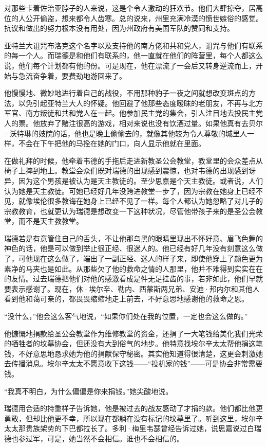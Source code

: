 \par 对那些卡着佐治亚脖子的人来说，这是个令人激动的狂欢节。他们大肆掠夺，居高位的人公开偷盗，想来都令人齿寒。总的说来，州里充满冷漠的愤世嫉俗的感觉。抗议和做出的努力根本没有用处，因为州政府有美国军队的赞同和支持。
\par 亚特兰大诅咒布洛克这个名字以及支持他的南方佬和共和党人，诅咒与他们有联系的每一个人。而瑞德是和他们有联系的，他一直就在他们的阵营里，每个人都这么说，他们每个计划都有他的份。可是现在，他在漂流了一会后又转身逆流而上，开始与急流奋争着，要费劲地游回来了。
\par 他慢慢地、微妙地进行着自己的战役，不用那种豹子一夜之间就想改变斑点的方法，以免引起亚特兰大人的怀疑。他回避了他那些态度暧昧的老朋友，不再与北方军官、南方叛徒和共和党人在一起。他参加民主党的集会，引人注目地去投民主党人的票。他放弃了赌注很高的游戏，相对来说也没有饮酒过量。如果他真有去贝尔·沃特琳的妓院的话，他也是晚上偷偷去的，就像其他较为令人尊敬的城里人一样，不会在下午把他的马拴在她的门口，向人显示他就在里面。
\par 在做礼拜的时候，他牵着韦德的手拖后走进新教圣公会教堂，教堂里的会众差点从椅子上摔到地上。教堂会众们既对瑞德的出现感到震惊，也对韦德的出现感到讶异，因为这个男孩是被认为是天主教徒的。至少思嘉是个天主教徒。或者说，人们认为她是天主教徒。可她已经好几年没跨进教堂一步了，因为宗教在她身上已经不见，就像埃伦很多教诲在她身上已经不见了一样。每个人都认为她忽略了对儿子的宗教教育，也就更认为瑞德是想改变一下这种状况，尽管他带孩子来的是圣公会教堂，而不是天主教教堂。
\par 瑞德若是有意管住自己的舌头，不让他那乌黑的眼睛里现出不怀好意、眉飞色舞的神色的话，他是可以做到举止很正经、很迷人的。他已经有好几年没有刻意这么做了，可他现在这么做了，端出了一副正经、迷人的样子来，即使他穿上了颜色更为素净的马夹也是如此。从那些欠了他的救命之情的人那里，他并不难得到实实在在的友情。过去瑞德把他们对他的感激看成是件无足挂齿的事，若非如此，他们早就要表示感谢了。现在，休·埃尔辛、勒内、西蒙斯两兄弟、安迪·邦内尔和其他人看到他和蔼可亲的，都畏畏缩缩地走上前去，不好意思地感谢他的救命之恩。
\par “没什么，”他会这么客气地说，“如果你们处在我的位置，一定也会这么做的。”
\par 他慷慨地捐款给圣公会教堂作为维修教堂的资金，还捐了一大笔钱给美化我们光荣的牺牲者的坟墓协会，但还没有大到俗气的地步。他特意找埃尔辛太太帮他捐这笔钱，不好意思地恳求她为他的捐献保守秘密。其实他知道得很清楚，这更会刺激她去传播消息。埃尔辛太太不愿意收下这钱——“投机家的钱”——可是协会非常需要钱。
\par “我真不明白，为什么偏偏是你来捐钱。”她尖酸地说。
\par 瑞德用合适的持重样子告诉她，他是被过去的战友感动了才捐的款。他们都比他更勇敢，但却比他更不幸，所以现在都躺在没有标记的坟墓里了。听到这里，埃尔辛太太那贵族架势的下巴都拉长了。多利·梅里韦瑟曾经告诉过她，说思嘉说过白瑞德也参过军，可是，她当然不会相信。谁也不会相信的。
